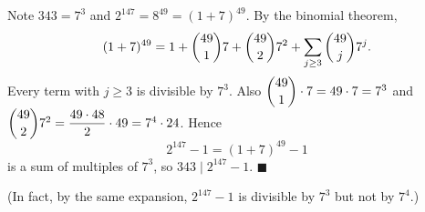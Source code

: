 Note $343=7^3$ and $2^{147}=8^{49}=(1+7)^{49}$. By the binomial theorem,
\[
(1+7)^{49}=1+\dbinom{49}{1}7+\dbinom{49}{2}7^2+\sum_{j\ge3}\dbinom{49}{j}7^j .
\]
Every term with $j\ge3$ is divisible by $7^3$. Also $\dbinom{49}{1}\cdot7=49\cdot7=7^3$ and $\dbinom{49}{2}7^2=\dfrac{49\cdot48}{2}\cdot49=7^4\cdot24$. Hence
\[
2^{147}-1=(1+7)^{49}-1
\]
is a sum of multiples of $7^3$, so $343\mid 2^{147}-1$. $\blacksquare$

(In fact, by the same expansion, $2^{147}-1$ is divisible by $7^3$ but not by $7^4$.)
